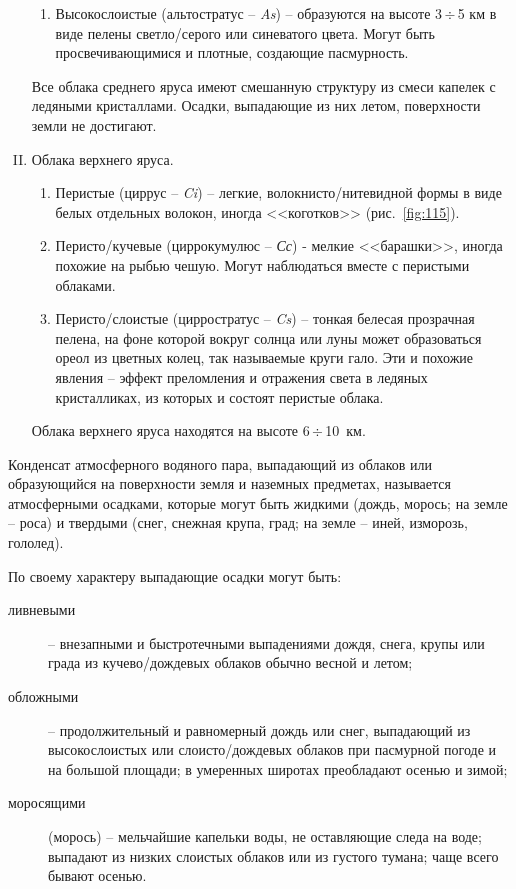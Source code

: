 \documentclass[a4paper, 12pt, twoside, final, book, russian, fittopage, cyremdash]{ncc}
\newcommand{\otdo}{\,\ensuremath{\div}\,}
\newcommand{\ris}[1]{\ref{fig:#1}}
\begin{document}
\begin{enumerate}[I.]
\begin{enumerate}[1)]
  \item Высокослоистые (альтостратус \--- \textit{As}) \--- образуются на высоте 3\otdo 5 км в виде пелены светло\-/серого или синеватого цвета. Могут быть просвечивающимися и плотные, создающие пасмурность.
  \end{enumerate}
  Все облака среднего яруса имеют смешанную структуру из смеси капелек с ледяными кристаллами. Осадки, выпадающие из них летом, поверхности земли не достигают.
\item Облака верхнего яруса. 
  \begin{enumerate}[1)]
  \item Перистые (циррус \--- \textit{Ci}) \--- легкие, волокнисто\-/нитевидной формы в виде белых отдельных волокон, иногда <<коготков>> (рис.~\ris{115}).
  \item  Перисто\-/кучевые (циррокумулюс \--- \textit{Сс}) - мелкие <<барашки>>, иногда похожие на рыбью чешую. Могут наблюдаться вместе с перистыми облаками.
    \item Перисто\-/слоистые (цирростратус \--- \textit{Cs}) \--- тонкая белесая прозрачная пелена, на фоне которой вокруг солнца или луны может образоваться ореол из цветных колец, так называемые круги гало. Эти и похожие явления \--- эффект преломления и отражения света в ледяных кристалликах, из которых и состоят перистые облака.
    \end{enumerate}
    Облака верхнего яруса находятся на высоте 6\otdo 10~км.
\end{enumerate}

Конденсат атмосферного водяного пара, выпадающий из облаков или образующийся на поверхности земля и наземных предметах, называется атмосферными осадками, которые могут быть жидкими (дождь, морось; на земле \--- роса) и твердыми (снег, снежная крупа, град; на земле \--- иней, изморозь, гололед).

По своему характеру выпадающие осадки могут быть:

\begin{description}
\item[ливневыми] \--- внезапными и быстротечными выпадениями дождя, снега, крупы или града из кучево\-/дождевых облаков обычно весной и летом;
\item[обложными] \--- продолжительный и равномерный дождь или снег, выпадающий из высокослоистых или слоисто\-/дождевых облаков при пасмурной погоде и на большой площади; в умеренных широтах преобладают осенью и зимой;
\item[моросящими] (морось) \--- мельчайшие капельки воды, не оставляющие следа на воде; выпадают из низких слоистых облаков или из густого тумана; чаще всего бывают осенью. 
\end{description}
\end{document}
